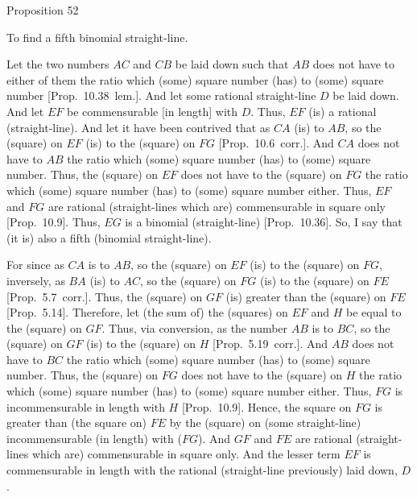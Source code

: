 
\begin{center}
{\large Proposition 52}
\end{center}

To find a fifth binomial straight-line.

\epsfysize=1.3in
\centerline{}

Let the two numbers $AC$ and $CB$ be laid down such that $AB$ does
not have to either of them the ratio which (some) square number (has)
to (some) square number [Prop.~10.38~lem.]. And
let some rational straight-line $D$ be laid down. And let $EF$ be
commensurable [in length] with $D$. Thus, $EF$ (is) a rational (straight-line).
And let it have been contrived that as $CA$ (is) to $AB$, so the (square) on
$EF$ (is) to the (square) on $FG$ [Prop.~10.6~corr.].
 And $CA$ does not have to $AB$ the ratio which (some)
 square number (has) to (some) square number. Thus, the (square) on
 $EF$ does not have to the (square) on $FG$ the ratio which (some)
 square number (has) to (some) square number either. Thus, $EF$ and
 $FG$ are rational (straight-lines which are) commensurable in square only
 [Prop.~10.9].  Thus, $EG$ is a binomial (straight-line) [Prop.~10.36]. So, I say that (it is) also
 a fifth (binomial straight-line).
 
 For since as $CA$ is to $AB$, so the (square) on $EF$ (is) to the (square)
 on $FG$, inversely, as $BA$ (is) to $AC$, so the (square) on $FG$ (is)
 to the (square) on $FE$ [Prop.~5.7~corr.]. Thus,
 the (square) on $GF$ (is) greater than the (square) on $FE$ [Prop.~5.14]. Therefore, let (the sum of) the (squares)
 on $EF$ and $H$ be equal to the (square) on $GF$. Thus, via conversion, 
 as the number $AB$ is to $BC$, so the (square) on $GF$ (is) to
 the (square) on $H$ [Prop.~5.19~corr.]. 
 And $AB$ does not have to $BC$ the ratio which (some) square number
 (has) to (some) square number. Thus, the (square) on $FG$ does not have
 to the (square) on $H$ the ratio which (some) square number (has) to
 (some) square number either. Thus, $FG$ is incommensurable in length
 with $H$ [Prop.~10.9]. Hence, the square on $FG$
 is greater than (the square on) $FE$ by the (square) on (some straight-line)
 incommensurable (in length) with ($FG$). And $GF$ and $FE$ are rational (straight-lines
 which are) commensurable in square only. And the lesser term $EF$ is commensurable in length with the  rational (straight-line previously)  laid down, $D$.
 
